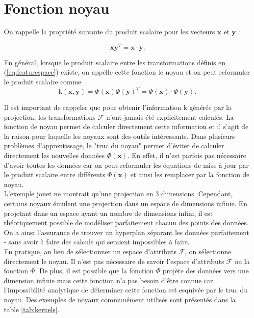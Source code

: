 \section{Fonction noyau}\label{sec:kernel}

On rappelle la propriété suivante du produit scalaire pour les vecteurs $\textbf{x}$ et $\textbf{y}$ : 

$$\textbf{x}\textbf{y}^T = \textbf{x} \cdot \textbf{y}.$$

En général, lorsque le produit scalaire entre les transformations définis en (\ref{eq:featurespace}) existe, on appèlle cette fonction le noyau et on peut reformuler le produit scalaire comme
$$\textrm{k}(\textbf{x}, \textbf{y}) = \Phi(\textbf{x})\Phi(\textbf{y})^T = \Phi(\textbf{x})\cdot \Phi(\textbf{y}).$$

Il est important de rappeler que pour obtenir l’information $\textrm{k}$ générée par la projection, les transformations $\mathcal{F}$ n'ont jamais été explicitement calculés. La fonction de noyau permet de calculer directement cette information et il s’agit de la raison pour laquelle les noyaux sont des outils intéressants. Dans plusieurs problèmes d'apprentissage, le "truc du noyau" permet d'éviter de calculer directement les nouvelles données $\Phi(\textbf{x})$. En effet, il n'est parfois pas nécessaire d'avoir toutes les données car on peut reformuler les équations de mise à jour par le produit scalaire entre différents $\Phi(\textbf{x})$ et ainsi les remplacer par la fonction de noyau. \\

L'exemple jouet ne montrait qu’une projection en 3 dimensions. Cependant, certains noyaux émulent une projection dans un espace de dimensions infinie. En projetant dans un espace ayant un nombre de dimensions infini, il est théoriquement possible de modéliser parfaitement chacun des points des données. On a ainsi l’assurance de trouver un hyperplan séparant les données parfaitement - sans avoir à faire des calculs qui seraient impossibles à faire.\\



En pratique, au lieu de sélectionner un espace d'attributs $\mathcal{F}$, on sélectionne directement le noyau. Il n'est pas nécessaire de savoir l'espace d'attributs $\mathcal{F}$ ou la fonction $\Phi$. De plus, il est possible que la fonction $\Phi$ projète des données vers une dimension infinie mais cette fonction n'a pas besoin d’être connue car l'impossibilité analytique de déterminer cette fonction est esquivée par le truc du noyau. Des exemples de noyaux communément utilisés sont présentés dans la table \ref{tab:kernels}.

